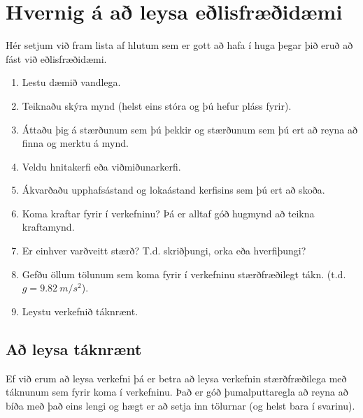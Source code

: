 \chapter*{Hvernig á að leysa eðlisfræðidæmi}

Hér setjum við fram lista af hlutum sem er gott að hafa í huga þegar þið eruð að fást við eðlisfræðidæmi.


\begin{enumerate}[label = \textbf{Skref \arabic*.}]
    \item Lestu dæmið vandlega.
    
    \item Teiknaðu skýra mynd (helst eins stóra og þú hefur pláss fyrir).
    
    \item Áttaðu þig á stærðunum sem þú þekkir og stærðunum sem þú ert að reyna að finna og merktu á mynd.
    
    \item Veldu hnitakerfi eða viðmiðunarkerfi.
    
    \item Ákvarðaðu upphafsástand og lokaástand kerfisins sem þú ert að skoða.
    
    \item Koma kraftar fyrir í verkefninu? Þá er alltaf góð hugmynd að teikna kraftamynd.
    
    \item Er einhver varðveitt stærð? T.d. skriðþungi, orka eða hverfiþungi?
    
    \item Gefðu öllum tölunum sem koma fyrir í verkefninu stærðfræðilegt tákn. (t.d. $g = \SI{9.82}{m/s^2}$).
    
    \item Leystu verkefnið táknrænt.
\end{enumerate}

\section*{Að leysa táknrænt}

Ef við erum að leysa verkefni þá er betra að leysa verkefnin stærðfræðilega með táknunum sem fyrir koma í verkefninu. Það er góð þumalputtaregla að reyna að bíða með það eins lengi og hægt er að setja inn tölurnar (og helst bara í svarinu).

